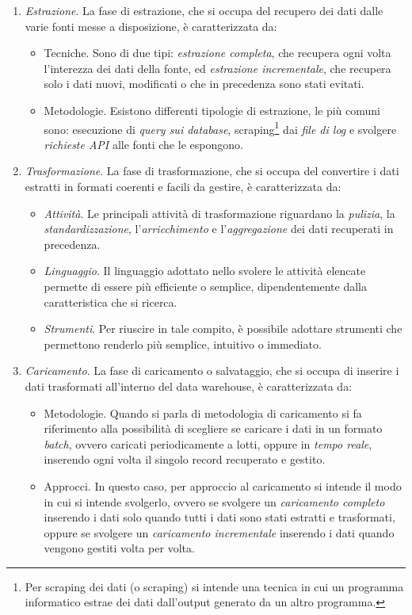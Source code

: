 \begin{enumerate}
    \item \textit{Estrazione}. La fase di estrazione, che si occupa del recupero dei dati dalle varie fonti messe a disposizione, è caratterizzata da:
    \begin{itemize}
        \item Tecniche. Sono di due tipi: \textit{estrazione completa}, che recupera ogni volta l'interezza dei dati della fonte, ed \textit{estrazione incrementale}, che recupera solo i dati nuovi, modificati o che in precedenza sono stati evitati.
        \item Metodologie. Esistono differenti tipologie di estrazione, le più comuni sono: esecuzione di \textit{query sui database}, scraping\footnote{Per scraping dei dati (o scraping) si intende una tecnica in cui un programma informatico estrae dei dati dall'output generato da un altro programma.\cite{cloudflare_scraping}} dai \textit{file di log} e svolgere \textit{richieste API} alle fonti che le espongono.
    \end{itemize}
    \item \textit{Trasformazione}. La fase di trasformazione, che si occupa del convertire i dati estratti in formati coerenti e facili da gestire, è caratterizzata da:
    \begin{itemize}
        \item \textit{Attività}. Le principali attività di trasformazione riguardano la \textit{pulizia}, la \textit{standardizzazione}, l'\textit{arricchimento} e l'\textit{aggregazione} dei dati recuperati in precedenza.
        \item \textit{Linguaggio}. Il linguaggio adottato nello svolere le attività elencate permette di essere più efficiente o semplice, dipendentemente dalla caratteristica che si ricerca.
        \item \textit{Strumenti}. Per riuscire in tale compito, è possibile adottare strumenti che permettono renderlo più semplice, intuitivo o immediato.
    \end{itemize}
    \item \textit{Caricamento}. La fase di caricamento o salvataggio, che si occupa di inserire i dati trasformati all'interno del data warehouse, è caratterizzata da:
    \begin{itemize}
        \item Metodologie. Quando si parla di metodologia di caricamento si fa riferimento alla possibilità di scegliere se caricare i dati in un formato \textit{batch}, ovvero caricati periodicamente a lotti, oppure in \textit{tempo reale}, inserendo ogni volta il singolo record recuperato e gestito.
        \item Approcci. In questo caso, per approccio al caricamento si intende il modo in cui si intende svolgerlo, ovvero se svolgere un \textit{caricamento completo} inserendo i dati solo quando tutti i dati sono stati estratti e trasformati, oppure se svolgere un \textit{caricamento incrementale} inserendo i dati  quando vengono gestiti volta per volta.
    \end{itemize}
\end{enumerate}

